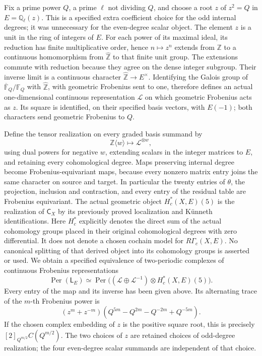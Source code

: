 Fix a prime power \(Q\), a prime \(\ell\) not dividing \(Q\), and
choose a root \(z\) of \(z^2=Q\) in
\(E=\mathbb Q_\ell(z)\). This is a specified extra coefficient
choice for the odd internal degrees; it was unnecessary for the
even-degree scalar object. The element \(z\) is a unit in the
ring of integers of \(E\). For each power of its maximal ideal,
its reduction has finite multiplicative order, hence
\(n\mapsto z^n\) extends from \(\mathbb Z\) to a continuous
homomorphism from \(\widehat{\mathbb Z}\) to that finite unit
group. The extensions commute with reduction because they agree
on the dense integer subgroup. Their inverse limit is a continuous
character \(\widehat{\mathbb Z}\to E^\times\).
Identifying the Galois group of \(\overline{\mathbb F}_Q/\mathbb F_Q\)
with \(\widehat{\mathbb Z}\), with geometric Frobenius sent to one,
therefore defines an actual one-dimensional continuous representation
\(\mathcal L\) on which geometric Frobenius acts as \(z\).
Its square is identified, on their specified basis vectors, with
\(E(-1)\); both characters send geometric Frobenius to \(Q\).

Define the tensor realization on every graded basis summand by
\[
 \mathbb Z\langle w\rangle\longmapsto\mathcal L^{\otimes w},
\]
using dual powers for negative \(w\), extending scalars in the
integer matrices to \(E\), and retaining every cohomological degree.
Maps preserving internal degree become Frobenius-equivariant maps,
because every nonzero matrix entry joins the same character on
source and target. In particular the twenty entries of \(\theta\),
the projection, inclusion and contraction, and every entry of the
residual table are Frobenius equivariant. The actual geometric
object \(H^*_c(X,E)(5)\) is the realization of \(\mathsf C_X\)
by its previously proved localization and K\"unneth identifications.
Here \(H^*_c\) explicitly denotes the direct sum of the actual
cohomology groups placed in their original cohomological degrees with
zero differential. It does not denote a chosen cochain model for
\(R\Gamma_c(X,E)\). No canonical splitting of that derived object
into its cohomology groups is asserted or used.
We obtain a specified equivalence of two-periodic complexes of
continuous Frobenius representations
\[
 \operatorname{Per}(\mathsf L_E)
 \simeq\operatorname{Per}\bigl((\mathcal L\oplus\mathcal L^{-1})
                                  \otimes H^*_c(X,E)(5)\bigr).
\]
Every entry of the map and its inverse has been given above. Its
alternating trace of the \(m\)-th Frobenius power is
\[
 (z^m+z^{-m})(Q^{5m}-Q^{2m}-Q^{-2m}+Q^{-5m}).
\]
If the chosen complex embedding of \(z\) is the positive square
root, this is precisely \([2]_{Q^{m/2}}C(Q^{m/2})\). The two choices
of \(z\) are retained choices of odd-degree realization; the four
even-degree scalar summands are independent of that choice.

